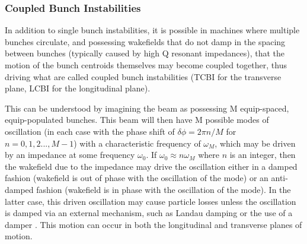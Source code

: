 \subsubsection{Coupled Bunch Instabilities}

In addition to single bunch instabilities, it is possible in machines where multiple bunches circulate, and possessing wakefields that do not damp in the spacing between bunches (typically caused by high Q resonant impedances), that the motion of the bunch centroids themselves may become coupled together, thus driving what are called coupled bunch instabilities (TCBI for the transverse plane, LCBI for the longitudinal plane). 

This can be understood by imagining the beam as possessing M equip-spaced, equip-populated bunches. This beam will then have M possible modes of oscillation (in each case with the phase shift of $\delta \phi = 2\pi n/M$ for $n = 0,1,2..., M-1$) with a characteristic frequency of $\omega_{M}$, which may be driven by an impedance at some frequency $\omega_{0}$. If $\omega_{0} \approx n\omega_{M}$ where $n$ is an integer, then the wakefield due to the impedance may drive the oscillation either in a damped fashion (wakefield is out of phase with the oscillation of the mode) or an anti-damped fashion (wakefield is in phase with the oscillation of the mode). In the latter case, this driven oscillation may cause particle losses unless the oscillation is damped via an external mechanism, such as Landau damping \cite{Palumbo:lanDamp} or the use of a damper \cite{Schmickler:Feedback}. This motion can occur in both the longitudinal and transverse planes of motion.

